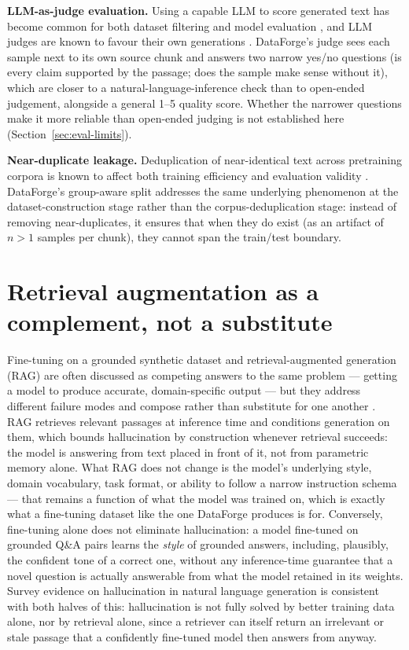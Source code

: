 \documentclass[11pt]{article}
\begin{document}
\textbf{LLM-as-judge evaluation.} Using a capable LLM to score generated
text has become common for both dataset filtering and model evaluation
\cite{zheng2023judging}, and LLM judges are known to favour their own
generations \cite{panickssery2024selfpref}. DataForge's judge sees each
sample next to its own source chunk and answers two narrow yes/no
questions (is every claim supported by the passage; does the sample make
sense without it), which are closer to a natural-language-inference check
than to open-ended judgement, alongside a general 1--5 quality score.
Whether the narrower questions make it more reliable than open-ended
judging is not established here (Section~\ref{sec:eval-limits}).

\textbf{Near-duplicate leakage.} Deduplication of near-identical text
across pretraining corpora is known to affect both training efficiency
and evaluation validity \cite{lee2022deduplicating}. DataForge's
group-aware split addresses the same underlying phenomenon at the
dataset-construction stage rather than the corpus-deduplication stage:
instead of removing near-duplicates, it ensures that when they do exist
(as an artifact of $n>1$ samples per chunk), they cannot span the
train/test boundary.

\section{Retrieval augmentation as a complement, not a substitute}
\label{sec:rag}

Fine-tuning on a grounded synthetic dataset and retrieval-augmented
generation (RAG) are often discussed as competing answers to the same
problem --- getting a model to produce accurate, domain-specific output
--- but they address different failure modes and compose rather than
substitute for one another \cite{gao2023ragsurvey}. RAG
\cite{lewis2020rag} retrieves relevant passages at inference time and
conditions generation on them, which bounds hallucination by construction
whenever retrieval succeeds: the model is answering from text placed in
front of it, not from parametric memory alone. What RAG does not change
is the model's underlying style, domain vocabulary, task format, or
ability to follow a narrow instruction schema — that remains a function
of what the model was trained on, which is exactly what a fine-tuning
dataset like the one DataForge produces is for. Conversely, fine-tuning
alone does not eliminate hallucination: a model fine-tuned on grounded
Q\&A pairs learns the \emph{style} of grounded answers, including,
plausibly, the confident tone of a correct one, without any inference-time
guarantee that a novel question is actually answerable from what the
model retained in its weights. Survey evidence on hallucination in
natural language generation \cite{ji2023hallucination} is consistent with
both halves of this: hallucination is not fully solved by better training
data alone, nor by retrieval alone, since a retriever can itself return
an irrelevant or stale passage that a confidently fine-tuned model then
answers from anyway.
\end{document}
